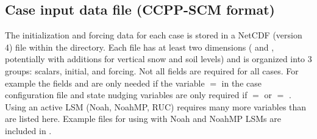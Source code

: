 \subsection{Case input data file (CCPP-SCM format)}
\label{subsection: case input}

The initialization and forcing data for each case is stored in a NetCDF (version 4) file within the  directory. Each file has at least two dimensions ( and , potentially with additions for vertical snow and soil levels) and is organized into 3 groups: scalars, initial, and forcing. Not all fields are required for all cases. For example the fields  and  are only needed if the variable  $=$  in the case configuration file and state nudging variables are only required if  $=$  or  $=$ . Using an active LSM (Noah, NoahMP, RUC) requires many more variables than are listed here. Example files for using with Noah and NoahMP LSMs are included in .




